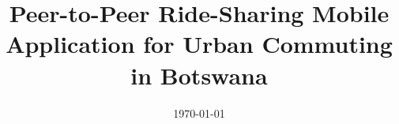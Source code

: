\documentclass{ecsgdp}
\begin{document}
\title{Peer-to-Peer Ride-Sharing Mobile Application for Urban Commuting in Botswana} %
\date{\today} %

\frontmatter
\maketitle
\tableofcontents
\listoffigures
\listoftables

\mainmatter

\backmatter


\appendix
\end{document}
